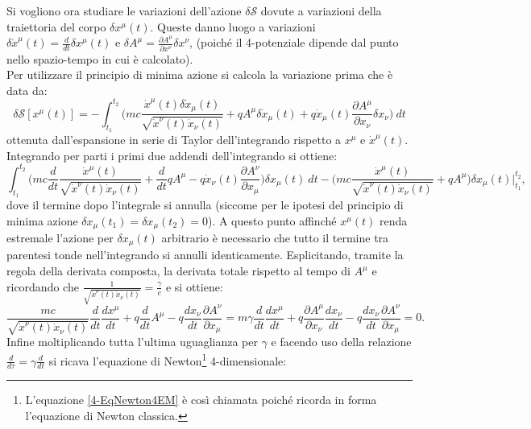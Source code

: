 Si vogliono ora studiare le variazioni dell'azione $\delta \mathcal{S}$ dovute a variazioni della traiettoria del corpo $\delta x^\mu(t)$. Queste danno luogo a variazioni $\delta \dot x^\mu(t)=\frac{d}{dt}\delta x^\mu(t)$ e $\delta A^\mu=\frac{\partial A^\mu}{\partial x^\nu}\delta x^\nu$, (poiché il 4-potenziale dipende dal punto nello spazio-tempo in cui è calcolato).\\ Per utilizzare il principio di minima azione si calcola la variazione prima che è data da:
\begin{equation*}
    \delta \mathcal{S} [x^\mu(t)]=-\int_{t_1}^{t_2}\bigg(mc\frac{\dot x^\mu(t)\delta\dot x_\mu(t)}{\sqrt{\dot x^\nu(t)\dot x_\nu(t)}}+qA^\mu\delta \dot x_\mu(t)+q\dot x_\mu(t)\frac{\partial A^\mu}{\partial x_\nu}\delta x_\nu\bigg)\ dt
\end{equation*} 
ottenuta dall'espansione in serie di Taylor dell'integrando rispetto a $x^\mu$ e $\dot x^\mu(t)$.\\
Integrando per parti i primi due addendi dell'integrando si ottiene:
\begin{equation*}
    \int_{t_1}^{t_2}\bigg(mc\frac{d}{dt}\frac{\dot x^\mu(t)}{\sqrt{\dot x^\nu(t)\dot x_\nu(t)}}+\frac{d}{dt}qA^\mu-q\dot x_\nu(t)\frac{\partial A^\nu}{\partial x_\mu}\bigg)\delta x_\mu(t)\ dt-\bigg(mc\frac{\dot x^\mu(t)}{\sqrt{\dot x^\nu(t)\dot x_\nu(t)}}+qA^\mu\bigg)\delta x_\mu(t)\bigg|_{t_1}^{t_2},
\end{equation*} 
dove il termine dopo l'integrale si annulla (siccome per le ipotesi del principio di minima azione $\delta x_\mu(t_1)=\delta x_\mu(t_2)=0$). A questo punto affinché $x^\mu(t)$ renda estremale l'azione per $\delta x_\mu(t)$ arbitrario è necessario che tutto il termine tra parentesi tonde nell'integrando si annulli identicamente. Esplicitando, tramite la regola della derivata composta, la derivata totale rispetto al tempo di $A^\mu$ e ricordando che $\frac{1}{\sqrt{\dot x^\nu(t)\dot x_\nu(t)}}=\frac{\gamma}{c}$ e si ottiene:
\begin{equation*}
    \frac{mc}{\sqrt{\dot x^\nu(t)\dot x_\nu(t)}}\frac{d}{dt}\frac{dx^\mu}{dt}+q\frac{d}{dt}A^\mu-q\frac{dx_\nu}{dt} \frac{\partial A^\nu}{\partial x_\mu}=m\gamma\frac{d}{dt}\frac{dx^\mu}{dt}+q\frac{\partial A^\mu}{\partial x_\nu}\frac{dx_\nu}{dt}-q\frac{dx_\nu}{dt} \frac{\partial A^\nu}{\partial x_\mu}=0.
\end{equation*}
Infine moltiplicando tutta l'ultima uguaglianza per $\gamma$ e facendo uso della relazione $\frac{d}{d\tau}=\gamma\frac{d}{dt}$ si ricava l'equazione di Newton\footnote{L'equazione \eqref{4-EqNewton4EM} è così chiamata poiché ricorda in forma l'equazione di Newton classica.} 4-dimensionale:
